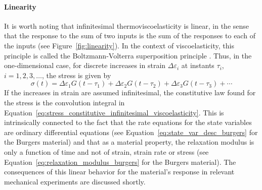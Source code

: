 \paragraph{Linearity}
It is worth noting that infinitesimal thermoviscoelasticity is linear, in the sense that the response to the sum of two inputs is the sum of the responses to each of the inputs (see Figure~\ref{fig:linearity}).
In the context of viscoelasticity, this principle is called the Boltzmann-Volterra superposition principle \citep{wardIntroductionMechanicalProperties2004}.
Thus, in the one-dimensional case, for discrete increases in strain $\Delta \varepsilon_i$ at instants $\tau_i$, $i=1,2,3,\dots$, the stress is given by
\begin{equation}
	\sigma (t) = \Delta \varepsilon_1 G(t - \tau_1) + \Delta \varepsilon_2 G(t - \tau_2) + \Delta \varepsilon_3 G(t - \tau_3) + \cdots
\end{equation}
If the increases in strain are assumed infinitesimal, the constitutive law found for the stress is the convolution integral in Equation~\eqref{eq:stress_constitutive_infinitesimal_viscoelasticity}.
This is intrinsically connected to the fact that the rate equations for the state variables are ordinary differential equations (see Equation~\eqref{eq:state_var_desc_burgers} for the Burgers material) and that as a material property, the relaxation modulus is only a function of time and not of strain, strain rate or stress (see Equation~\eqref{eq:relaxation_modulus_burgers} for the Burgers material).
The consequences of this linear behavior for the material's response in relevant mechanical experiments are discussed shortly.
